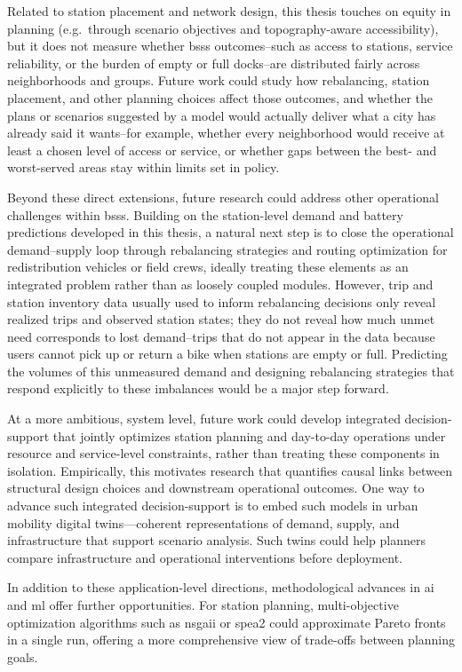 Related to station placement and network design, this thesis touches on equity in planning (e.g.\ through scenario objectives and topography-aware accessibility), but it does not measure whether \acp{bss} outcomes--such as access to stations, service reliability, or the burden of empty or full docks--are distributed fairly across neighborhoods and groups. Future work could study how rebalancing, station placement, and other planning choices affect those outcomes, and whether the plans or scenarios suggested by a model would actually deliver what a city has already said it wants--for example, whether every neighborhood would receive at least a chosen level of access or service, or whether gaps between the best- and worst-served areas stay within limits set in policy.


Beyond these direct extensions, future research could address other operational challenges within \acp{bss}. Building on the station-level demand and battery predictions developed in this thesis, a natural next step is to close the operational demand--supply loop through rebalancing strategies and routing optimization for redistribution vehicles or field crews, ideally treating these elements as an integrated problem rather than as loosely coupled modules. However, trip and station inventory data usually used to inform rebalancing decisions only reveal realized trips and observed station states; they do not reveal how much unmet need corresponds to lost demand--trips that do not appear in the data because users cannot pick up or return a bike when stations are empty or full. Predicting the volumes of this unmeasured demand and designing rebalancing strategies that respond explicitly to these imbalances would be a major step forward.

At a more ambitious, system level, future work could develop integrated decision-support that jointly optimizes station planning and day-to-day operations under resource and service-level constraints, rather than treating these components in isolation. Empirically, this motivates research that quantifies causal links between structural design choices and downstream operational outcomes. One way to advance such integrated decision-support is to embed such models in urban mobility digital twins---coherent representations of demand, supply, and infrastructure that support scenario analysis. Such twins could help planners compare infrastructure and operational interventions before deployment.

In addition to these application-level directions, methodological advances in \ac{ai} and \ac{ml} offer further opportunities. For station planning, multi-objective optimization algorithms such as \ac{nsgaii} or \ac{spea2} could approximate Pareto fronts in a single run, offering a more comprehensive view of trade-offs between planning goals.

